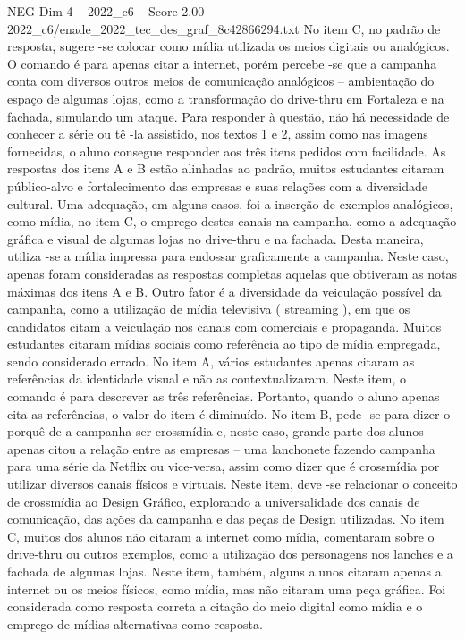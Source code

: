 \begin{textsample}{NEG Dim 4 – 2022\_c6 – Score 2.00 – 2022\_c6/enade\_2022\_tec\_des\_graf\_8c42866294.txt}
No item C, no padrão de resposta, sugere -se colocar como mídia utilizada os meios digitais ou analógicos.
O comando é para apenas citar a internet, porém percebe -se que a campanha conta com diversos outros meios de comunicação analógicos – ambientação do espaço de algumas lojas, como a transformação do drive-thru em Fortaleza e na fachada, simulando um ataque.
Para responder à questão, não há necessidade de conhecer a série ou tê -la assistido, nos textos 1 e 2, assim como nas imagens fornecidas, o aluno consegue responder aos três itens pedidos com facilidade.
As respostas dos itens A e B estão alinhadas ao padrão, muitos estudantes citaram público-alvo e fortalecimento das empresas e suas relações com a diversidade cultural.
Uma adequação, em alguns casos, foi a inserção de exemplos analógicos, como mídia, no item C, o emprego destes canais na campanha, como a adequação gráfica e visual de algumas lojas no drive-thru e na fachada.
Desta maneira, utiliza -se a mídia impressa para endossar graficamente a campanha.
Neste caso, apenas foram consideradas as respostas completas aquelas que obtiveram as notas máximas dos itens A e B.
Outro fator é a diversidade da veiculação possível da campanha, como a utilização de mídia televisiva ( streaming ), em que os candidatos citam a veiculação nos canais com comerciais e propaganda.
Muitos estudantes citaram mídias sociais como referência ao tipo de mídia empregada, sendo considerado errado.
No item A, vários estudantes apenas citaram as referências da identidade visual e não as contextualizaram.
Neste item, o comando é para descrever as três referências.
Portanto, quando o aluno apenas cita as referências, o valor do item é diminuído.
No item B, pede -se para dizer o porquê de a campanha ser crossmídia e, neste caso, grande parte dos alunos apenas citou a relação entre as empresas – uma lanchonete fazendo campanha para uma série da Netflix ou vice-versa, assim como dizer que é crossmídia por utilizar diversos canais físicos e virtuais.
Neste item, deve -se relacionar o conceito de crossmídia ao Design Gráfico, explorando a universalidade dos canais de comunicação, das ações da campanha e das peças de Design utilizadas.
No item C, muitos dos alunos não citaram a internet como mídia, comentaram sobre o drive-thru ou outros exemplos, como a utilização dos personagens nos lanches e a fachada de algumas lojas.
Neste item, também, alguns alunos citaram apenas a internet ou os meios físicos, como mídia, mas não citaram uma peça gráfica.
Foi considerada como resposta correta a citação do meio digital como mídia e o emprego de mídias alternativas como resposta.

\end{textsample}
